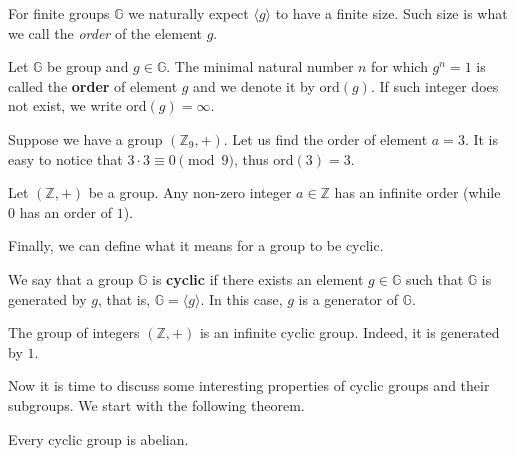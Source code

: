 \documentclass[../../book.tex]{subfiles}
\begin{document}
For finite groups $\mathbb{G}$ we naturally expect $\langle g \rangle$ to have a finite 
size. Such size is what we call the \textit{order} of the element $g$.

\vspace{-1mm}

\begin{definition}
    Let $\mathbb{G}$ be group and $g \in \mathbb{G}$. The minimal natural number
    $n$ for which $g^n = 1$ is called the \textbf{order} of element $g$ and
    we denote it by $\text{ord}(g)$. If such integer does not exist, we write
    $\text{ord}(g)=\infty$.
\end{definition}

\begin{example}
    Suppose we have a group $(\mathbb{Z}_9, +)$. Let us find the order of
    element $a = 3$. It is easy to notice that $3 \cdot 3 \equiv 0 \pmod{9}$,
    thus $\text{ord}(3) = 3$.
\end{example}

\begin{example}
    Let $(\mathbb{Z}, +)$ be a group. Any non-zero integer $a \in \mathbb{Z}$
    has an infinite order (while $0$ has an order of $1$).
\end{example}

\vspace{-1mm}

Finally, we can define what it means for a group to be cyclic.

\vspace{-1mm}

\begin{definition}
    We say that a group $\mathbb{G}$ is \textbf{cyclic} if there exists an element $g \in \mathbb{G}$ 
    such that $\mathbb{G}$ is generated by $g$, that is, $\mathbb{G} = \langle g \rangle$. 
    In this case, $g$ is a generator of $\mathbb{G}$.
\end{definition}

\vspace{-4mm}

\begin{example}
    The group of integers $(\mathbb{Z},+)$ is an infinite cyclic group. Indeed, it is 
    generated by $1$.
\end{example}

Now it is time to discuss some interesting properties of cyclic groups and their
subgroups. We start with the following theorem.

\begin{theorem}
    Every cyclic group is abelian.
\end{theorem}
\end{document}
